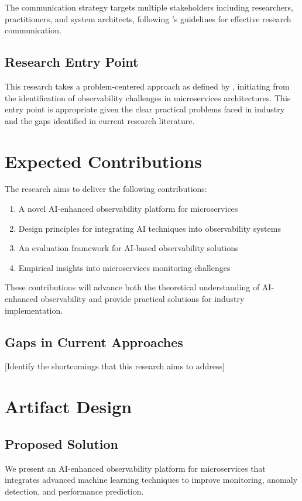 \documentclass[10pt,journal,compsoc]{IEEEtran}
\begin{document}
The communication strategy targets multiple stakeholders including researchers, practitioners, and system architects, following \cite{hevner2004design}'s guidelines for effective research communication.

\subsection{Research Entry Point}

This research takes a problem-centered approach as defined by \cite{peffers2007design}, initiating from the identification of observability challenges in microservices architectures. This entry point is appropriate given the clear practical problems faced in industry and the gaps identified in current research literature.

\section{Expected Contributions}

The research aims to deliver the following contributions:

\begin{enumerate}
    \item A novel AI-enhanced observability platform for microservices
    \item Design principles for integrating AI techniques into observability systems
    \item An evaluation framework for AI-based observability solutions
    \item Empirical insights into microservices monitoring challenges
\end{enumerate}

These contributions will advance both the theoretical understanding of AI-enhanced observability and provide practical solutions for industry implementation.


\subsection{Gaps in Current Approaches}
[Identify the shortcomings that this research aims to address]

\section{Artifact Design}
\subsection{Proposed Solution}
We present an AI-enhanced observability platform for microservices that integrates advanced machine learning techniques to improve monitoring, anomaly detection, and performance prediction.
\end{document}
